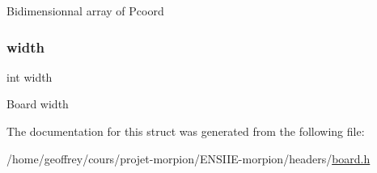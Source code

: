 Bidimensionnal array of Pcoord \mbox{\label{structboard_a2474a5474cbff19523a51eb1de01cda4}} 
\subsubsection{\texorpdfstring{width}{width}}
{\footnotesize\ttfamily int width}

Board width 

The documentation for this struct was generated from the following file\+:\begin{DoxyCompactItemize}
\item 
/home/geoffrey/cours/projet-\/morpion/\+E\+N\+S\+I\+I\+E-\/morpion/headers/\hyperlink{board_8h}{board.\+h}\end{DoxyCompactItemize}
